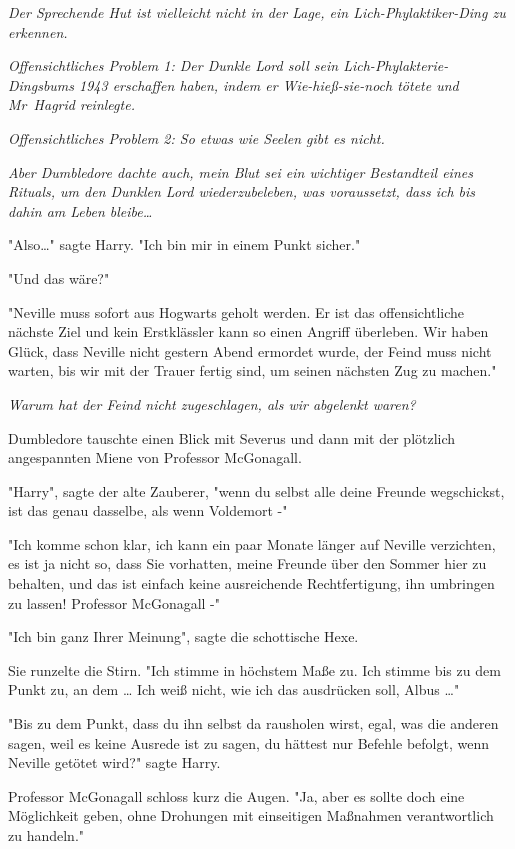 {\emph{Der Sprechende Hut ist vielleicht nicht in der Lage, ein Lich-Phylaktiker-Ding zu erkennen.}

\emph{Offensichtliches Problem 1: Der Dunkle Lord soll sein Lich-Phylakterie-Dingsbums 1943 erschaffen haben, indem er Wie-hieß-sie-noch tötete und Mr~Hagrid reinlegte.}

\emph{Offensichtliches Problem 2: So etwas wie Seelen gibt es nicht.}

\emph{Aber Dumbledore dachte auch, mein Blut sei ein wichtiger Bestandteil eines Rituals, um den Dunklen Lord wiederzubeleben, was voraussetzt, dass ich bis dahin am Leben bleibe…}

"Also…" sagte Harry. "Ich bin mir in einem Punkt sicher."

"Und das wäre?"

"Neville muss sofort aus Hogwarts geholt werden. Er ist das offensichtliche nächste Ziel und kein Erstklässler kann so einen Angriff überleben. Wir haben Glück, dass Neville nicht gestern Abend ermordet wurde, der Feind muss nicht warten, bis wir mit der Trauer fertig sind, um seinen nächsten Zug zu machen."

\emph{Warum hat der Feind nicht zugeschlagen, als wir abgelenkt waren?}

Dumbledore tauschte einen Blick mit Severus und dann mit der plötzlich angespannten Miene von Professor McGonagall.

"Harry", sagte der alte Zauberer, "wenn du selbst alle deine Freunde wegschickst, ist das genau dasselbe, als wenn Voldemort -"

"Ich komme schon klar, ich kann ein paar Monate länger auf Neville verzichten, es ist ja nicht so, dass Sie vorhatten, meine Freunde über den Sommer hier zu behalten, und das ist einfach keine ausreichende Rechtfertigung, ihn umbringen zu lassen! Professor McGonagall -"

"Ich bin ganz Ihrer Meinung", sagte die schottische Hexe.

Sie runzelte die Stirn. "Ich stimme in höchstem Maße zu. Ich stimme bis zu dem Punkt zu, an dem … Ich weiß nicht, wie ich das ausdrücken soll, Albus …"

"Bis zu dem Punkt, dass du ihn selbst da rausholen wirst, egal, was die anderen sagen, weil es keine Ausrede ist zu sagen, du hättest nur Befehle befolgt, wenn Neville getötet wird?" sagte Harry.

Professor McGonagall schloss kurz die Augen. "Ja, aber es sollte doch eine Möglichkeit geben, ohne Drohungen mit einseitigen Maßnahmen verantwortlich zu handeln."

}

